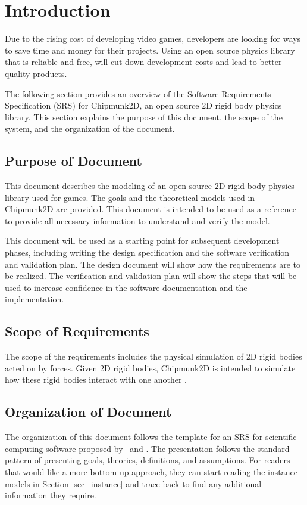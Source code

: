 \documentclass[12pt]{article}
\begin{document}
\section{Introduction}
Due to the rising cost of developing video games, developers are looking for
ways to save time and money for their projects. Using an open source physics
library that is reliable and free, will cut down development costs and lead 
to better quality products.

The following section provides an overview of the Software Requirements
Specification (SRS) for Chipmunk2D, an open source 2D rigid body physics library. 
This section explains the purpose of this document,
the scope of the system, and the organization of the document.

\subsection{Purpose of Document}

This document describes the modeling of an open source
2D rigid body physics library used for games. The goals and the theoretical
models used in Chipmunk2D are provided. This document is intended to be 
used as a reference to provide all necessary information to understand and verify
the model.

This document will be used as a starting point for subsequent development
phases, including writing the design specification and the software verification
and validation plan. The design document will show how the requirements are 
to be realized. The verification and validation plan will show the steps that will 
be used to increase confidence in the software documentation and the 
implementation.

\subsection{Scope of Requirements} 

The scope of the requirements includes the physical simulation of 2D rigid bodies 
acted on by forces. Given 2D rigid bodies, Chipmunk2D is intended to 
simulate how these rigid bodies interact with one another .

\subsection{Organization of Document}
The organization of this document follows the template for an SRS for scientific
computing software proposed by~\cite{Koothoor2013} and \cite{SmithAndLai2005}.
The presentation follows the standard pattern of presenting goals, theories,
definitions, and assumptions.  For readers that would like a more bottom up
approach, they can start reading the instance models in Section
\ref{sec_instance} and trace back to find any additional information they
require. 
\end{document}
